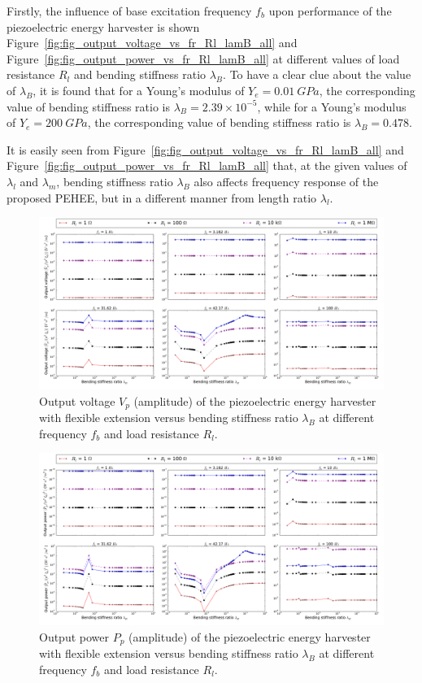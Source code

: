 \documentclass{elsarticle}
\begin{document}
Firstly, the influence of base excitation frequency $f_b$ upon performance of the piezoelectric energy harvester is shown Figure~\ref{fig:fig_output_voltage_vs_fr_Rl_lamB_all} and Figure~\ref{fig:fig_output_power_vs_fr_Rl_lamB_all} at different values of load resistance $R_l$ and bending stiffness ratio $\lambda_B$. To have a clear clue about the value of $\lambda_B$, it is found that for a Young's modulus of $Y_e = 0.01\ GPa$, the corresponding value of bending stiffness ratio is $\lambda_B = 2.39\times10^{-5}$, while for a Young's modulus of $Y_e = 200\ GPa$, the corresponding value of bending stiffness ratio is $\lambda_B = 0.478$.

It is easily seen from Figure~\ref{fig:fig_output_voltage_vs_fr_Rl_lamB_all} and Figure~\ref{fig:fig_output_power_vs_fr_Rl_lamB_all} that, at the given values of $\lambda_l$ and $\lambda_m$, bending stiffness ratio $\lambda_B$ also affects frequency response of the proposed PEHEE, but in a different manner from length ratio $\lambda_l$. 


\begin{figure}[!htbp]
    \centering
    \includegraphics[width=\textwidth]{./fig_vol_fr_sl_Rl_sl_vs_lamB}
    \caption{Output voltage $V_p$ (amplitude) of the piezoelectric energy harvester with flexible extension versus bending stiffness ratio $\lambda_B$ at different frequency $f_b$ and load resistance $R_l$. }
    \label{fig:fig_vol_fr_sl_Rl_sl_vs_lamB}
\end{figure}

\begin{figure}[!htbp]
    \centering
    \includegraphics[width=\textwidth]{./fig_pow_fr_sl_Rl_sl_vs_lamB}
    \caption{Output power $P_p$ (amplitude) of the piezoelectric energy harvester with flexible extension versus bending stiffness ratio $\lambda_B$ at different frequency $f_b$ and load resistance $R_l$. }
    \label{fig:fig_pow_fr_sl_Rl_sl_vs_lamB}
\end{figure}
\end{document}
